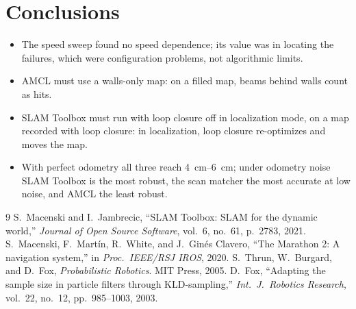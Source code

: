 \documentclass[10pt,letterpaper]{article}
\begin{document}
\section{Conclusions}\label{sec:conclusions}

\begin{itemize}
  \item The speed sweep found no speed dependence; its value was in locating the failures, which were
        configuration problems, not algorithmic limits.
  \item AMCL must use a walls-only map: on a filled map, beams behind walls count as hits.
  \item SLAM Toolbox must run with loop closure off in localization mode, on a map recorded with loop
        closure: in localization, loop closure re-optimizes and moves the map.
  \item With perfect odometry all three reach \SIrange{4}{6}{cm}; under odometry noise SLAM Toolbox is
        the most robust, the scan matcher the most accurate at low noise, and AMCL the least robust.
\end{itemize}

{\small
\begin{thebibliography}{9}\setlength{\itemsep}{0pt}
S.~Macenski and I.~Jambrecic, ``SLAM Toolbox: SLAM for the dynamic world,'' \emph{Journal of Open
Source Software}, vol.~6, no.~61, p.~2783, 2021.
S.~Macenski, F.~Mart\'in, R.~White, and J.~Gin\'es Clavero, ``The Marathon 2: A navigation
system,'' in \emph{Proc.\ IEEE/RSJ IROS}, 2020.
S.~Thrun, W.~Burgard, and D.~Fox, \emph{Probabilistic Robotics}. MIT Press, 2005.
D.~Fox, ``Adapting the sample size in particle filters through KLD-sampling,'' \emph{Int.\ J.\
Robotics Research}, vol.~22, no.~12, pp.~985--1003, 2003.
\end{thebibliography}}
\end{document}
